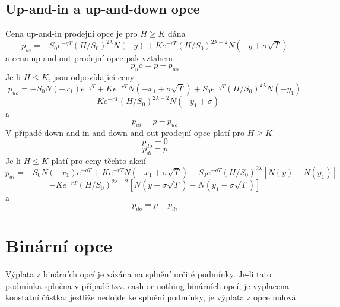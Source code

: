 \documentclass[a4paper]{book}
\begin{document}
\subsection{Up-and-in a up-and-down opce}

Cena up-and-in prodejní opce je pro $H \ge K$ dána
\begin{equation*}
p_{ui} = -S_0e^{-qT}(H/S_0)^{2 \lambda}N(-y)+Ke^{-rT}(H/S_0)^{2 \lambda - 2}N(-y+\sigma \sqrt{T})
\end{equation*}
a cena up-and-out prodejní opce pak vztahem
\begin{equation*}
p_uo = p - p_{uo}
\end{equation*}
Je-li $H \le K$, jsou odpovídající ceny
\begin{equation*}
p_{uo} = -S_0N(-x_1)e^{-qT}+Ke^{-rT}N(-x_1+\sigma \sqrt{T})+S_0e^{-qT}(H/S_0)^{2\lambda}N(-y_1)
\end{equation*}
\begin{equation*}
-Ke^{-rT}(H/S_0)^{2 \lambda - 2}N(-y_1+\sigma)
\end{equation*}
a
\begin{equation*}
p_{ui}=p-p_{uo}
\end{equation*}
V případě down-and-in and down-and-out prodejní opce platí pro $H \ge K$
\begin{equation*}
p_{do} = 0
\end{equation*}
\begin{equation*}
p_{di} = p
\end{equation*}
Je-li $H \le K$ platí pro ceny těchto akcií
\begin{equation*}
p_{di}=-S_0N(-x_1)e^{-qT}+Ke^{-rT}N(-x_1 + \sigma \sqrt{T})+S_0e^{-qT}(H/S_0)^{2 \lambda}[N(y)-N(y_1)]
\end{equation*}
\begin{equation*}
-Ke^{-rT}(H/S_0)^{2 \lambda -2}[N(y-\sigma \sqrt{T})-N(y_1 - \sigma \sqrt{T})]
\end{equation*}
a
\begin{equation*}
p_{do} = p - p_{di}
\end{equation*}

\section{Binární opce}

Výplata z binárních opcí je vázána na splnění určité podmínky. Je-li tato podmínka splněna v případě tzv. cash-or-nothing binárních opcí, je vyplacena konstatní částka; jestliže nedojde ke splnění podmínky, je výplata z opce nulová.
\end{document}
